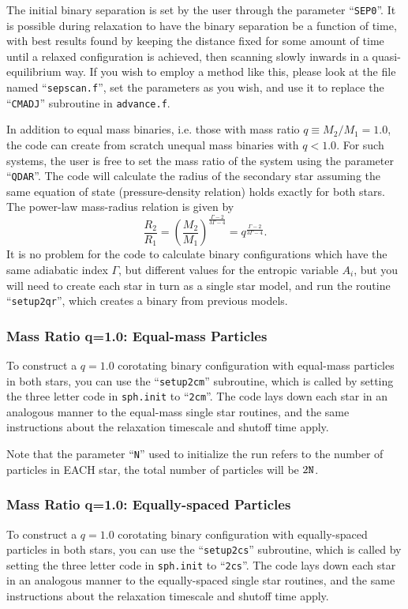 The initial binary separation is set by the user through the parameter
``{\tt SEP0}''.  It is possible during relaxation to have the binary
separation be a function of time, with best results found by keeping
the distance fixed for some amount of time until a relaxed
configuration is achieved, then scanning slowly inwards in a
quasi-equilibrium way.  If you wish to employ a method like this,
please look at the file named ``{\tt sepscan.f}'', set the parameters
as you wish, and use it to replace the ``{\tt CMADJ}'' subroutine in
{\tt advance.f}.

In addition to equal mass binaries, i.e. those with mass ratio
$q\equiv M_2/M_1=1.0$, the code can create from scratch unequal mass binaries
with $q<1.0$.  For such systems, the user is free to set the mass
ratio of the system using the parameter ``{\tt QDAR}''.  The code will
calculate the radius of the secondary star assuming the same equation
of state (pressure-density relation) holds exactly for both stars.
The power-law mass-radius relation is given by
\begin{equation}
\frac{R_2}{R_1}=\left(\frac{M_2}{M_1}\right)^{\frac{\Gamma-2}{3\Gamma-4}}=
q^{\frac{\Gamma-2}{3\Gamma-4}}. 
\end{equation}
It is no problem for the code to calculate binary configurations which
have the same adiabatic index $\Gamma$, but different values for the
entropic variable $A_i$, but you will need to create each star in turn as
a single star model, and run the routine ``{\tt setup2qr}'', which
creates a binary from previous models.

\subsubsection{Mass Ratio q=1.0: Equal-mass Particles}
\label{in:2c:em}
To construct a $q=1.0$ corotating binary configuration with equal-mass
particles in both stars, you can use the
``{\tt setup2cm}'' subroutine, which is called by setting the three
letter code in {\tt sph.init} to ``{\tt 2cm}''.  
The code lays down each star in an analogous manner to the equal-mass
single star routines, and the same instructions about the relaxation
timescale and shutoff time apply.

Note that the parameter ``{\tt N}'' used to initialize the run refers
to the number of particles in EACH star, the total number of particles
will be $2{\tt N}$.

\subsubsection{Mass Ratio q=1.0: Equally-spaced Particles}
\label{in:2c:es}
To construct a $q=1.0$ corotating binary configuration with
equally-spaced particles 
in both stars, you can use the
``{\tt setup2cs}'' subroutine, which is called by setting the three
letter code in {\tt sph.init} to ``{\tt 2cs}''.  
The code lays down each star in an analogous manner to the equally-spaced
single star routines, and the same instructions about the relaxation
timescale and shutoff time apply.

